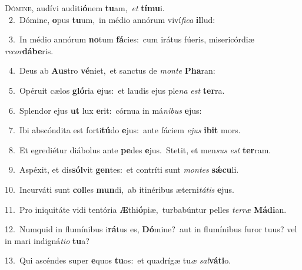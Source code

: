 \lettrine{\initial\textcolor{\initialcolor}{D}}{ómine,} audívi auditi\-\textbf{ó}\-nem \textbf{tu}\-am,~\star \textit{et} \textbf{tí}\-\textbf{mu}i.\\
{\numbfont\textcolor{\numbcolor}{~2.}}~Dómine, \textbf{o}\-pus \textbf{tu}\-um,~\star in médio annórum viví\-\textit{fi}\-\textit{ca} \textbf{il}\-lud:\par
{\numbfont\textcolor{\numbcolor}{~3.}}~In médio annórum \textbf{no}\-tum \textbf{fá}\-cies:~\star cum irátus fúeris, misericórdiæ \textit{re}\-\textit{cor}\textbf{dá}\textbf{be}ris.\par
{\numbfont\textcolor{\numbcolor}{~4.}}~Deus ab \textbf{Aus}\-tro \textbf{vé}\-niet,~\star et sanctus de \textit{mon}\-\textit{te} \textbf{Pha}\-ran:\par
{\numbfont\textcolor{\numbcolor}{~5.}}~Opéruit cælos \textbf{gló}\-ria \textbf{e}\-jus:~\star et laudis ejus ple\textit{na} \textit{est} \textbf{ter}\-ra.\par
{\numbfont\textcolor{\numbcolor}{~6.}}~Splendor ejus \textbf{ut} lux \textbf{e}\-rit:~\star córnua in má\-\textit{ni}\-\textit{bus} \textbf{e}\-jus:\par
{\numbfont\textcolor{\numbcolor}{~7.}}~Ibi abscóndita est forti\-\textbf{tú}\-do \textbf{e}\-jus:~\star ante fáciem \textit{e}\-\textit{jus} \textbf{i}\-\textbf{bit} mors.\par
{\numbfont\textcolor{\numbcolor}{~8.}}~Et egrediétur diábolus ante \textbf{pe}\-des \textbf{e}\-jus.~\star Stetit, et men\textit{sus} \textit{est} \textbf{ter}\-ram.\par
{\numbfont\textcolor{\numbcolor}{~9.}}~Aspéxit, et dis\-\textbf{sól}\-vit \textbf{gen}\-tes:~\star et contríti sunt \textit{mon}\-\textit{tes} \textbf{sǽ}\-\textbf{cu}li.\par
{\numbfont\textcolor{\numbcolor}{10.}}~Incurváti sunt \textbf{col}\-les \textbf{mun}\-di,~\star ab itinéribus æterni\-\textit{tá}\-\textit{tis} \textbf{e}\-jus.\par
{\numbfont\textcolor{\numbcolor}{11.}}~Pro iniquitáte vidi tentória \textbf{Æ}\-thi\-\textbf{ó}\-piæ,~\star turbabúntur pelles \textit{ter}\-\textit{ræ} \textbf{Má}\-\textbf{di}an.\par
{\numbfont\textcolor{\numbcolor}{12.}}~Numquid in flumínibus i\-\textbf{rá}\-tus es, \textbf{Dó}\-mine?~\star aut in flumínibus furor tuus? vel in mari indigná\-\textit{ti}\-\textit{o} \textbf{tu}\-a?\par
{\numbfont\textcolor{\numbcolor}{13.}}~Qui ascéndes super \textbf{e}\-quos \textbf{tu}\-os:~\star et quadrígæ tu\textit{æ} \textit{sal}\-\textbf{vá}\textbf{ti}o.\par
